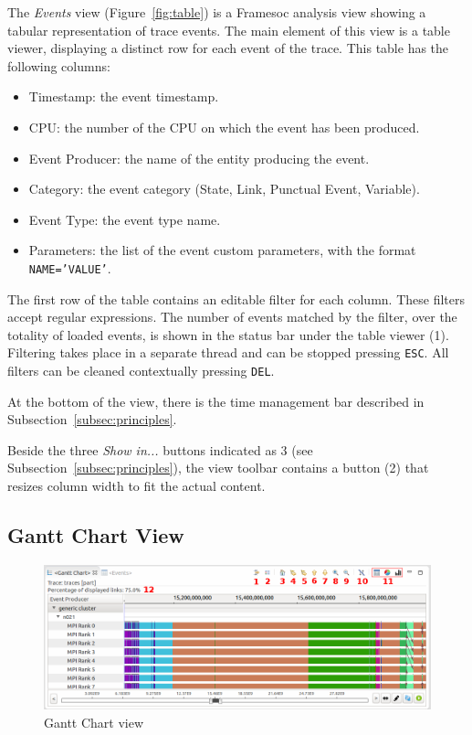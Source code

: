 \documentclass[twoside]{article}
\begin{document}
\begin{sloppypar}
The \emph{Events} view (Figure~\ref{fig:table}) is a Framesoc analysis view showing a tabular representation of trace events.
The main element of this view is a table viewer, displaying a distinct row for each event of the trace.
This table has the following columns:
\begin{itemize}
 \item Timestamp: the event timestamp.
 \item CPU: the number of the CPU on which the event has been produced.
 \item Event Producer: the name of the entity producing the event.
 \item Category: the event category (State, Link, Punctual Event, Variable).
 \item Event Type: the event type name.
 \item Parameters: the list of the event custom parameters, with the format \texttt{NAME='VALUE'}.
\end{itemize}
The first row of the table contains an editable filter for each column. 
These filters accept regular expressions.
The number of events matched by the filter, over the totality of loaded events, is shown in the status bar under the table viewer (\num{1}).
Filtering takes place in a separate thread and can be stopped pressing \texttt{ESC}. 
All filters can be cleaned contextually pressing \texttt{DEL}.

At the bottom of the view, there is the time management bar described in Subsection~\ref{subsec:principles}.

Beside the three \emph{Show in...} buttons indicated as \num{3} (see Subsection~\ref{subsec:principles}), the view toolbar contains a button (\num{2}) that resizes column width to fit the actual content.

\subsection{Gantt Chart View}
\label{subsec:gantt}

\begin{figure}[h!]
  \centering
    \includegraphics[width=1.0\textwidth]{images/gantt.png}
  \caption{Gantt Chart view}
  \label{fig:gantt}
\end{figure}


\end{sloppypar}
\end{document}

